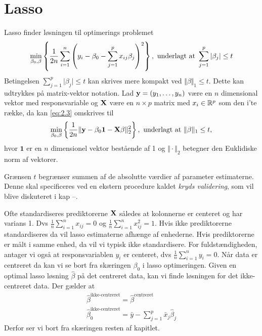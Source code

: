 \section{Lasso}
Lasso finder løsningen til optimerings problemet
\begin{align}
\min_{\beta_0, \beta} \cbr{\frac{1}{2n} \sum_{i=1}^n \del{y_i - \beta_0 - \sum_{j=1}^p x_{ij} \beta_j}^2}, \ \text{underlagt at } \sum_{j=1}^p \vert \beta_j \vert \leq t \label{eq:2.3}
\end{align}
Betingelsen $\sum_{j=1}^p \vert \beta_j \vert \leq t$ kan skrives mere kompakt ved $\Vert \beta \Vert_1 \leq t$.
Dette kan udtrykkes på matrix-vektor notation.
Lad \(\mathbf{y}=(y_1, \ldots, y_n)\) være en \(n\) dimensional vektor med responsvariable og \(\mathbf{X}\) være en $n \times p$ matrix med $x_i \in \mathbb{R}^p$ som den i'te række, da kan \eqref{eq:2.3} omskrives til
\begin{align*}
\min_{\beta_0, \beta} \cbr{\frac{1}{2n} \Vert \y - \beta_0 \mathbf{1} - \X \beta \Vert_2^2}, \ \text{underlagt at } \Vert \beta \Vert_1 \leq t,
\end{align*}
hvor \(\mathbf{1}\) er en \(n\) dimensionel vektor bestående af 1 og \(\Vert \cdot \Vert_2\) betegner den Euklidiske norm af vektorer.

Grænsen \(t\) begrænser summen af de absolutte værdier af parameter estimaterne.
Denne skal specificeres ved en ekstern procedure kaldet \textit{kryds validering}, som vil blive diskuteret i kap --.

Ofte standardiseres prediktorerne \(\mathbf{X}\) således at kolonnerne er centeret og har varians 1. Dvs \(\frac{1}{n} \sum_{i=1}^n x_{ij} = 0\) og \(\frac{1}{n} \sum_{i=1}^n x_{ij}^2=1\). Hvis ikke prediktorerne standardiseres da vil lasso estimaterne afhænge af enhederne.
Hvis prediktorerne er målt i samme enhed, da vil vi typisk ikke standardisere.
For fuldstændigheden, antager vi også at responsvariablen $y_i$ er centeret, dvs \(\frac{1}{n} \sum_{i=1}^n y_{i} = 0\).
Når data er centreret da kan vi se bort fra skæringen $\beta_0$ i lasso optimeringen.
Given en optimal lasso løsning \(\hat{\beta}\) på det centreret data, kan vi finde løsningen for det ikke-centreret data. Der gælder at
\begin{align*}
\hat{\beta}^{\text{ikke-centreret}} = \hat{\beta}^{\text{centreret}} \\
\hat{\beta}_0^{\text{ikke-centreret}} = \bar{y} - \sum_{j=1}^p \bar{x}_j \hat{\beta}_j
\end{align*}
Derfor ser vi bort fra skæringen resten af kapitlet.

